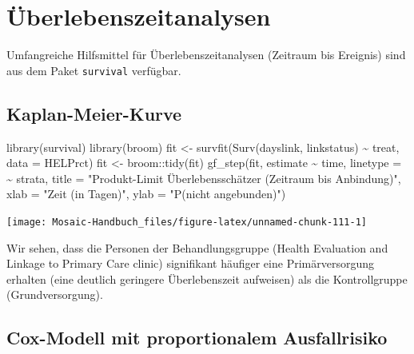 \documentclass[
  ngerman,
]{scrbook}
\newenvironment{Shaded}{\begin{snugshade}}{\end{snugshade}}
\newcommand{\AttributeTok}[1]{\textcolor[rgb]{0.77,0.63,0.00}{#1}}
\newcommand{\FunctionTok}[1]{\textcolor[rgb]{0.00,0.00,0.00}{#1}}
\newcommand{\NormalTok}[1]{#1}
\newcommand{\OtherTok}[1]{\textcolor[rgb]{0.56,0.35,0.01}{#1}}
\newcommand{\SpecialCharTok}[1]{\textcolor[rgb]{0.00,0.00,0.00}{#1}}
\newcommand{\StringTok}[1]{\textcolor[rgb]{0.31,0.60,0.02}{#1}}
\begin{document}
\hypertarget{uxfcberlebenszeitanalysen}{%
\chapter{Überlebenszeitanalysen}\label{uxfcberlebenszeitanalysen}}

Umfangreiche Hilfsmittel für Überlebenszeitanalysen (Zeitraum bis Ereignis) sind aus dem Paket \texttt{survival} verfügbar.

\hypertarget{kaplan-meier-kurve}{%
\section{Kaplan-Meier-Kurve}\label{kaplan-meier-kurve}}

\begin{Shaded}
\begin{Highlighting}[]
\FunctionTok{library}\NormalTok{(survival)}
\FunctionTok{library}\NormalTok{(broom)}
\NormalTok{fit }\OtherTok{\textless{}{-}} \FunctionTok{survfit}\NormalTok{(}\FunctionTok{Surv}\NormalTok{(dayslink, linkstatus) }\SpecialCharTok{\textasciitilde{}}\NormalTok{ treat, }
               \AttributeTok{data =}\NormalTok{ HELPrct)}
\NormalTok{fit }\OtherTok{\textless{}{-}}\NormalTok{ broom}\SpecialCharTok{::}\FunctionTok{tidy}\NormalTok{(fit)}
\FunctionTok{gf\_step}\NormalTok{(fit, estimate }\SpecialCharTok{\textasciitilde{}}\NormalTok{ time, }\AttributeTok{linetype =} \SpecialCharTok{\textasciitilde{}}\NormalTok{ strata,}
        \AttributeTok{title =} \StringTok{"Produkt{-}Limit Überlebensschätzer (Zeitraum bis Anbindung)"}\NormalTok{,}
        \AttributeTok{xlab  =} \StringTok{"Zeit (in Tagen)"}\NormalTok{, }\AttributeTok{ylab =} \StringTok{"P(nicht angebunden)"}\NormalTok{)}
\end{Highlighting}
\end{Shaded}

\begin{center}\texttt{[image: Mosaic-Handbuch\_files/figure-latex/unnamed-chunk-111-1]} \end{center}

Wir sehen, dass die Personen der Behandlungsgruppe (Health Evaluation and Linkage to Primary Care clinic) signifikant häufiger eine Primärversorgung erhalten (eine deutlich geringere Überlebenszeit aufweisen) als die Kontrollgruppe (Grundversorgung).

\hypertarget{cox-modell-mit-proportionalem-ausfallrisiko}{%
\section{Cox-Modell mit proportionalem Ausfallrisiko}\label{cox-modell-mit-proportionalem-ausfallrisiko}}
\end{document}
